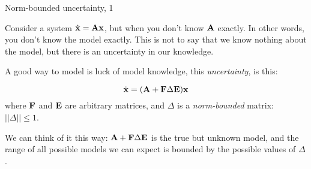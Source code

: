 \documentclass{beamer}
\begin{document}
	
	
	\begin{frame}{Norm-bounded uncertainty, 1}
		\begin{flushleft}
			
			Consider a system $\dot{\mathbf{x}} = \mathbf{A}\mathbf{x}$, but when you don't know $\mathbf{A}$ exactly. In other words, you don't know the model exactly. This is not to say that we know nothing about the model, but there is an uncertainty in our knowledge.
			
			\bigskip
			
			A good way to model is luck of model knowledge, this \emph{uncertainty}, is this:
			
			\begin{equation}
				\label{eq:uncertain}
				\dot{\mathbf{x}} = (\mathbf{A} + \mathbf{F} \Delta \mathbf{E})\mathbf{x}
			\end{equation}
			where $\mathbf{F}$ and $\mathbf{E}$ are arbitrary matrices, and $\Delta$ is a \emph{norm-bounded} matrix: $||\Delta|| \leq 1$.
			
			\bigskip
			
			We can think of it this way: $\mathbf{A} + \mathbf{F} \Delta \mathbf{E}$ is the true but unknown model, and the range of all possible models we can expect is bounded by the possible values of $\Delta$.
			
		\end{flushleft}
	\end{frame}
	
	
	
\end{document}
